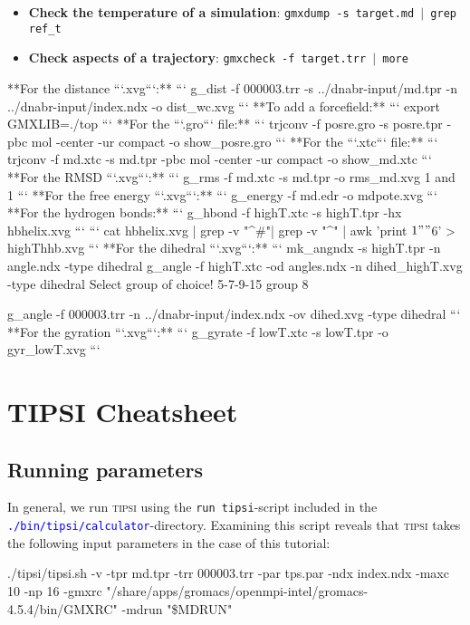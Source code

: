 \documentclass[]{article}
\begin{document}
\begin{itemize}
\item \textbf{Check the temperature of a simulation}: \texttt{gmxdump -s target.md $|$ grep ref\_t}
\item \textbf{Check aspects of a trajectory}: \texttt{gmxcheck -f target.trr $|$ more}
\end{itemize}

**For the distance ```.xvg```:**
```
g_dist -f 000003.trr -s ../dnabr-input/md.tpr -n ../dnabr-input/index.ndx -o dist_wc.xvg
```
**To add a forcefield:**
```
export GMXLIB=./top
```
**For the ```.gro``` file:**
```
trjconv -f posre.gro -s posre.tpr -pbc mol -center -ur compact -o show_posre.gro
```
**For the ```.xtc``` file:**
```
trjconv -f md.xtc -s md.tpr -pbc mol -center -ur compact -o show_md.xtc
```
**For the RMSD ```.xvg```:**
```
g_rms -f md.xtc -s md.tpr -o rms_md.xvg
1 and 1
```
**For the free energy ```.xvg```:**
```
g_energy -f md.edr -o mdpote.xvg
```
**For the hydrogen bonds:**
```
g_hbond -f highT.xtc -s highT.tpr -hx hbhelix.xvg
```
```
cat hbhelix.xvg | grep -v "^\#"| grep -v "^\@" | awk '{print $1"  "$6}' > highThhb.xvg
```
**For the dihedral ```.xvg```:**
```
mk_angndx -s highT.tpr -n angle.ndx -type dihedral
g_angle -f highT.xtc -od angles.ndx -n dihed_highT.xvg -type dihedral
Select group of choice! 5-7-9-15 group 8

g_angle -f 000003.trr -n ../dnabr-input/index.ndx -ov dihed.xvg -type dihedral
```
**For the gyration ```.xvg```:**
```
g_gyrate -f lowT.xtc -s lowT.tpr -o gyr_lowT.xvg
```

\newpage
\section*{TIPSI Cheatsheet}

\subsection*{Running parameters}

In general, we run \textsc{tipsi} using the \texttt{run tipsi}-script included in the \textcolor{blue}{\texttt{./bin/tipsi/calculator}}-directory. 
Examining this script reveals that \textsc{tipsi} takes the following input parameters in the case of this tutorial:

\begin{lslisting}
./tipsi/tipsi.sh -v -tpr md.tpr -trr 000003.trr -par tps.par -ndx index.ndx -maxc 10 -np 16 -gmxrc "/share/apps/gromacs/openmpi-intel/gromacs-4.5.4/bin/GMXRC" -mdrun "\$MDRUN"
\end{lslisting}
\end{document}
